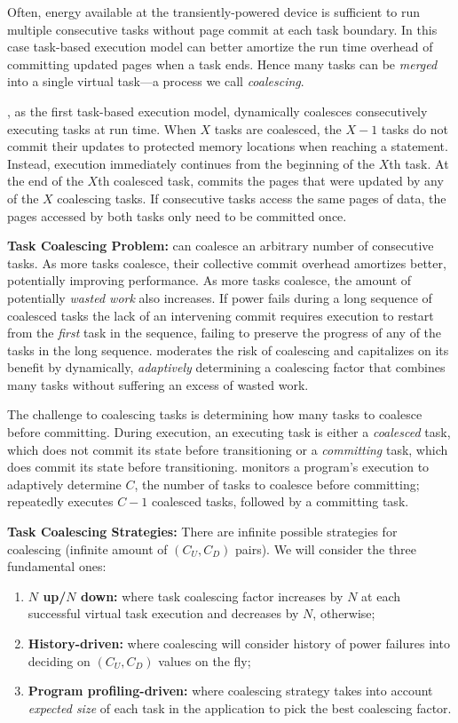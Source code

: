 Often, energy available at the transiently-powered device is sufficient to run multiple consecutive tasks without page commit at each task boundary. In this case task-based execution model can better amortize the run time overhead of committing updated pages when a task ends. Hence many tasks can be \emph{merged} into a single virtual task---a process we call \emph{coalescing}. 

\sys, as the first task-based execution model, dynamically coalesces consecutively executing tasks at run time. When $X$ tasks are coalesced, the $X-1$ tasks do not commit their updates to protected memory locations when reaching a \transition statement. Instead, execution immediately continues from the beginning of the $X$th task. At the end of the $X$th coalesced task, \sys commits the pages that were updated by any of the $X$ coalescing tasks. If consecutive tasks access the same pages of data, the pages accessed by both tasks only need to be committed once.

\textbf{Task Coalescing Problem:} \sys can coalesce an arbitrary number of consecutive tasks. As more tasks coalesce, their collective commit overhead amortizes better, potentially improving performance. As more tasks coalesce, the amount of potentially {\em wasted work} also increases. If power fails during a long sequence of coalesced tasks the lack of an intervening commit requires execution to restart from the {\em first} task in the sequence, failing to preserve the progress of any of the tasks in the long sequence. \sys moderates the risk of coalescing and capitalizes on its benefit by dynamically, \emph{adaptively} determining a coalescing factor that combines many tasks without suffering an excess of wasted work. 

The challenge to coalescing tasks is determining how many tasks to coalesce before committing. During execution, an executing task is either a {\em coalesced} task, which does not commit its state before transitioning or a {\em committing} task, which does commit its state before transitioning. \sys monitors a program's execution to adaptively determine $C$, the number of tasks to coalesce before committing; \sys repeatedly executes $C-1$ coalesced tasks,
followed by a committing task. 

\textbf{Task Coalescing Strategies:} There are infinite possible strategies for coalescing (infinite amount of $(C_U,C_D)$ pairs). We will consider the three fundamental ones:

\begin{enumerate}
	\item \textbf{$N$ up/$N$ down:} where task coalescing factor increases by $N$ at each successful virtual task execution and decreases by $N$, otherwise;
	\item \textbf{History-driven:} where coalescing will consider history of power failures into deciding on $(C_U,C_D)$ values on the fly;
	\item \textbf{Program profiling-driven:} where coalescing strategy takes into account \emph{expected size} of each task in the application to pick the best coalescing factor.
\end{enumerate}

